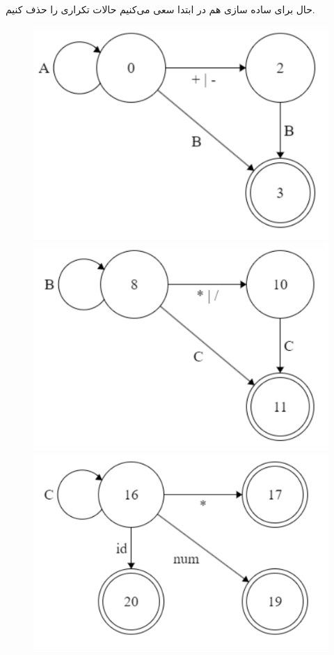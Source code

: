 \documentclass[]{article}
\begin{document}
حال برای ساده سازی هم در ابتدا سعی می‌کنیم حالات تکراری را حذف کنیم.
\begin{figure}[H]
    \centering
    \includegraphics[scale=0.5]{figure/5-1-A-2.png}
    \includegraphics[scale=0.5]{figure/5-1-B-2.png}
    \includegraphics[scale=0.5]{figure/5-1-C-2.png}
\end{figure}
\end{document}
